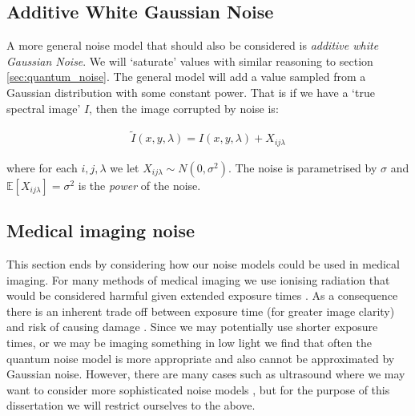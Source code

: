 \documentclass[12pt,twoside,notitlepage]{report}
\newcommand{\bb}[1]{\mathbb{#1}}
\begin{document}
        \subsection{Additive White Gaussian Noise}
            A more general noise model that should also be considered is \textit{additive white Gaussian Noise}. We will 
            `saturate' values with similar reasoning to section \ref{sec:quantum_noise}. The general model will add a 
            value sampled from a Gaussian distribution with some constant power. That is if we have a `true spectral image' 
            $I$, then the image corrupted by noise is:

            \begin{align}
                \tilde{I}(x,y,\lambda) = I(x,y,\lambda) + X_{ij\lambda}
            \end{align}

            where for each $i, j, \lambda$ we let $X_{ij\lambda} \sim N(0, \sigma^2)$. The noise is parametrised by 
            $\sigma$ and $\bb{E}[X_{ij\lambda}] = \sigma^2$ is the \textit{power} of the noise.

        \subsection{Medical imaging noise}
            This section ends by considering how our noise models could be used in medical imaging. For many methods 
            of medical imaging we use ionising radiation that would be considered harmful given extended exposure times 
            \cite{picano2004sustainability}. As a consequence there is an inherent trade off between exposure time (for 
            greater image clarity) and risk of causing damage \cite{sprawls1987physical}. Since we may potentially 
            use shorter exposure times, or we may be imaging something in low light we find that often the quantum noise 
            model is more appropriate and also cannot be approximated by Gaussian noise. However, there are many cases 
            such as ultrasound where we may want to consider more sophisticated noise models \cite{coupe2009nonlocal}, 
            but for the purpose of this dissertation we will restrict ourselves to the above.
\end{document}
